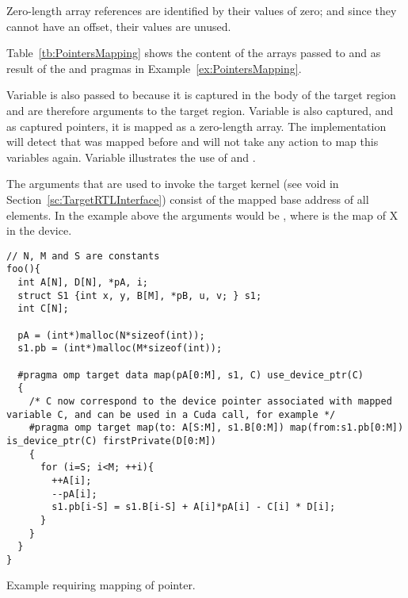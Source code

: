 Zero-length array references are identified by their  values of zero; and since they cannot have an offset, their  values are unused.

Table~\ref{tb:PointersMapping} shows the content of the arrays passed to  and  as result of the \dtargetdata{} and \dtarget{} pragmas in Example~\ref{ex:PointersMapping}.

Variable  is also passed to  because it is captured in the body of the target region and are therefore arguments to the target region. Variable  is also captured, and as captured pointers, it is mapped as a zero-length array. The \libomptarget{} implementation will detect that  was mapped before and will not take any action to map this variables again. Variable  illustrates the use of  and .

The arguments that are used to invoke the target kernel (see void  in Section~\ref{sc:TargetRTLInterface}) consist of the mapped base address of all elements. In the example above the arguments would be , where  is the map of {X} in the device.

\begin{example}
\lstset{basicstyle=\scriptsize,frame=single}
\begin{lstlisting}
// N, M and S are constants
foo(){
  int A[N], D[N], *pA, i;
  struct S1 {int x, y, B[M], *pB, u, v; } s1;
  int C[N];
  
  pA = (int*)malloc(N*sizeof(int)); 
  s1.pb = (int*)malloc(M*sizeof(int)); 

  #pragma omp target data map(pA[0:M], s1, C) use_device_ptr(C)
  { 
    /* C now correspond to the device pointer associated with mapped variable C, and can be used in a Cuda call, for example */
    #pragma omp target map(to: A[S:M], s1.B[0:M]) map(from:s1.pb[0:M]) is_device_ptr(C) firstPrivate(D[0:M])
    {
      for (i=S; i<M; ++i){ 
        ++A[i]; 
        --pA[i]; 
        s1.pb[i-S] = s1.B[i-S] + A[i]*pA[i] - C[i] * D[i]; 
      }
    }
  }
}
\end{lstlisting}
\lstset{basicstyle=\small\bfseries,frame=none}
\caption{Example requiring mapping of pointer.}
\label{ex:PointersMapping}
\end{example}

